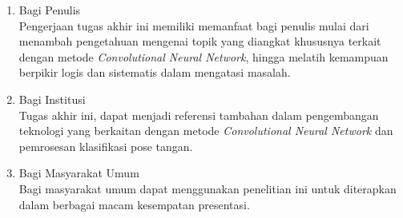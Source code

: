 \begin{enumerate}[nolistsep]

  \item Bagi Penulis
  \mbox{}\\Pengerjaan tugas akhir ini memiliki memanfaat bagi penulis mulai dari menambah pengetahuan mengenai topik yang diangkat khususnya terkait dengan metode \emph{Convolutional Neural Network}, hingga melatih kemampuan berpikir logis dan sistematis dalam mengatasi masalah.
  \item Bagi Institusi
  \mbox{}\\Tugas akhir ini, dapat menjadi referensi tambahan dalam pengembangan teknologi yang berkaitan dengan metode \emph{Convolutional Neural Network} dan pemrosesan klasifikasi pose tangan.
  \item Bagi Masyarakat Umum
  \mbox{}\\Bagi masyarakat umum dapat menggunakan penelitian ini untuk diterapkan dalam berbagai macam kesempatan presentasi.

\end{enumerate}


